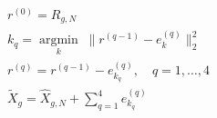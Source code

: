 \documentclass[border=7pt,varwidth=108mm]{standalone}
\begin{document}
\color{ink}\fontsize{15}{23}\selectfont
\[
\begin{gathered} r^{(0)}=R_{g,N}\\ k_q=\underset{k}{\operatorname{argmin}}\;\|r^{(q-1)}-e_k^{(q)}\|_2^2\\ r^{(q)}=r^{(q-1)}-e_{k_q}^{(q)},\quad q=1,\ldots,4\\ \widetilde X_g=\widehat X_{g,N}+\sum_{q=1}^{4}e_{k_q}^{(q)}\end{gathered}
\]
\end{document}

